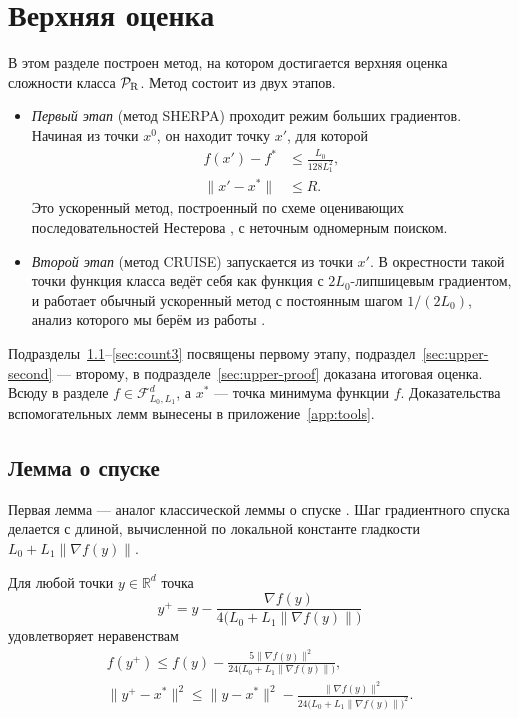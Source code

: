 \documentclass[11pt,a4paper]{article}
\newcommand{\R}{\mathbb R}
\newcommand{\F}{\mathcal F}
\newcommand{\norm}[1]{\|#1\|}
\begin{document}
\section{Верхняя оценка}\label{sec:upper}

В этом разделе построен метод, на котором достигается верхняя оценка сложности класса $\mathcal P_{\rm R}$. Метод состоит из двух этапов.
\begin{itemize}
\item \emph{Первый этап} (метод SHERPA) проходит режим больших градиентов. Начиная из точки $x^0$, он находит точку $x'$, для которой
\begin{equation}\label{eq:stage-one-goal}
\begin{aligned}
 f(x')-f^\ast&\le\frac{L_0}{128L_1^2},\\
 \norm{x'-x^\ast}&\le R .
\end{aligned}
\end{equation}
Это ускоренный метод, построенный по схеме оценивающих последовательностей Нестерова \citep[§2.2]{nesterov2018lectures}, с неточным одномерным поиском.
\item \emph{Второй этап} (метод CRUISE) запускается из точки $x'$. В окрестности такой точки функция класса ведёт себя как функция с $2L_0$-липшицевым градиентом, и работает обычный ускоренный метод с постоянным шагом $1/(2L_0)$, анализ которого мы берём из работы \citet{tyurin2026accelerated}.
\end{itemize}
Подразделы~\ref{sec:upper-descent}--\ref{sec:count3} посвящены первому этапу, подраздел~\ref{sec:upper-second} --- второму, в подразделе~\ref{sec:upper-proof} доказана итоговая оценка. Всюду в разделе $f\in\F_{L_0,L_1}^d$, а $x^\ast$ --- точка минимума функции $f$. Доказательства вспомогательных лемм вынесены в приложение~\ref{app:tools}.

\subsection{Лемма о спуске}\label{sec:upper-descent}

Первая лемма --- аналог классической леммы о спуске \citep[лемма~1.2.3]{nesterov2018lectures}. Шаг градиентного спуска делается с длиной, вычисленной по локальной константе гладкости $L_0+L_1\norm{\nabla f(y)}$.

\begin{lemma}\label{lem:safe-step}
Для любой точки $y\in\R^d$ точка
\[
 y^+=y-\frac{\nabla f(y)}{4\bigl(L_0+L_1\norm{\nabla f(y)}\bigr)}
\]
удовлетворяет неравенствам
\begin{gather*}
 f(y^+)\le f(y)-\frac{5\norm{\nabla f(y)}^2}{24\bigl(L_0+L_1\norm{\nabla f(y)}\bigr)},\\
 \norm{y^+-x^\ast}^2\le\norm{y-x^\ast}^2-\frac{\norm{\nabla f(y)}^2}{24\bigl(L_0+L_1\norm{\nabla f(y)}\bigr)^2} .
\end{gather*}
\end{lemma}
\end{document}
